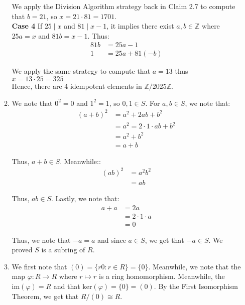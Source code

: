 \documentclass{article}
\begin{document}
\begin{enumerate}
\begin{enumerate}
    We apply the Division Algorithm strategy back in Claim 2.7 to compute that $b = 21$, so $x = 21 \cdot 81 = 1701$. \\ 

    \textbf{Case 4} If $25 \mid x$ and $81 \mid x-1$, it implies there exist $a, b \in \mathbb{Z}$ where $25a = x$ and $81b = x - 1$. Thus: 
    \begin{align*}
        81b &= 25a - 1 \\
        1 &= 25a + 81(-b)
    \end{align*}

    We apply the same strategy to compute that $a = 13$ thus $x = 13 \cdot 25 = 325$ \\ 

    Hence, there are 4 idempotent elements in $\mathbb{Z} / 2025 \mathbb{Z}$. \\

    \item 
    We note that $0^2 = 0$ and $1^2 = 1$, so $0, 1 \in S$. For $a,b \in S$, we note that: 
    \begin{align*}
        (a + b)^2 &= a^2 + 2ab + b^2 \\
        &= a^2 = 2 \cdot 1 \cdot ab + b^2 \\
        &= a^2 + b^2 \\
        &= a + b 
    \end{align*}

    Thus, $a + b \in S$. Meanwhile:: 
    \begin{align*}
        (ab)^2 &= a^2 b^2 \\
        &= ab
    \end{align*}

    Thus, $ab \in S$. Lastly, we note that: 
    \begin{align*}
        a + a &= 2a \\
        &= 2 \cdot 1 \cdot a \\
        &= 0
    \end{align*}

    Thus, we note that $-a = a$ and since $a \in S$, we get that $-a \in S$. We proved $S$ is a subring of $R$. \\

    \item 
    We first note that $(0) = \{r0 : r \in R\} = \{0\}$. Meanwhile, we note that the map $\varphi: R \rightarrow R$ where $r \mapsto r$ is a ring homomorphism. Meanwhile, the $\text{im}(\varphi) = R$ and that $\text{ker}(\varphi) = \{0\} = (0)$. By the First Isomorphism Theorem, we get that $R/(0) \cong R$. \\


\end{enumerate}
\end{enumerate}
\end{document}
